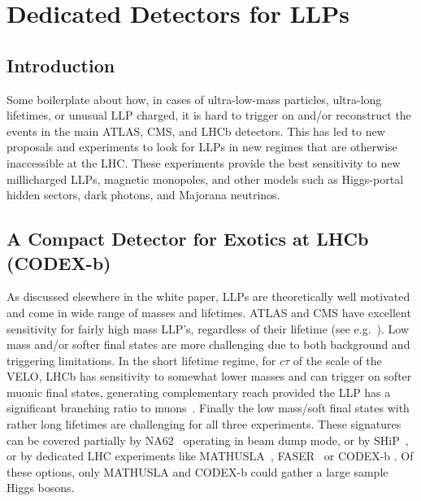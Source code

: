 \section{Dedicated Detectors for LLPs}
\subsection{Introduction}

Some boilerplate about how, in cases of ultra-low-mass particles, ultra-long lifetimes, or unusual LLP charged, it is hard to trigger on and/or reconstruct the events in the main ATLAS, CMS, and LHCb detectors. This has led to new proposals and experiments to look for LLPs in new regimes that are otherwise inaccessible at the LHC. These experiments provide the best sensitivity to new millicharged LLPs, magnetic monopoles, and other models such as Higgs-portal hidden sectors, dark photons, and Majorana neutrinos.


\subsection{A Compact Detector for Exotics at LHCb (CODEX-b)}
\label{sec:CODEX-b}

As discussed elsewhere in the white paper, LLPs are theoretically well motivated and come in wide range of masses and lifetimes. ATLAS and CMS have excellent sensitivity for fairly high mass LLP's, regardless of their lifetime  (see e.g.~\cite{CMS:2016ybj,Aaboud:2016dgf,CMS-PAS-EXO-16-003,ATLAS-CONF-2016-103}). Low mass and/or softer final states are more challenging due to both background and triggering limitations. In the short lifetime regime, for $c\tau$ of the scale of the VELO, LHCb has sensitivity to somewhat lower masses and can trigger on softer muonic final states, generating complementary reach provided the LLP has a significant branching ratio to muons~\cite{Aaij:2017mic,Aaij:2016xmb,Aaij:2016isa,Aaij:2015ica,Aaij:2014nma}. Finally the low mass/soft final states with rather long lifetimes are challenging for all three experiments. These signatures can be covered partially by NA62~\cite{NA62:2017rwk} operating in beam dump mode, or by SHiP~\cite{Alekhin:2015byh}, or by dedicated LHC experiments like MATHUSLA~\cite{Chou:2016lxi}, FASER~\cite{Feng:2017uoz} or CODEX-b \cite{Gligorov:2017nwh}. Of these options, only MATHUSLA and CODEX-b could gather a large sample Higgs bosons.



